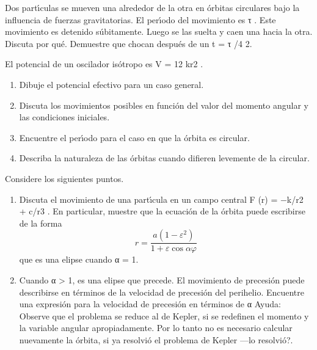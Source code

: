 \documentclass[10pt,oneside]{CBFT_book}
\begin{document}
\begin{ejercicios}

\label{ej1}
\item{ \bf }
Dos partı́culas se mueven una alrededor de la otra en órbitas circulares bajo la influencia
de fuerzas gravitatorias. El perı́odo del movimiento es τ . Este movimiento es detenido
súbitamente. Luego se las suelta y caen una hacia la otra. Discuta por qué. Demuestre
que chocan después de un t = τ /4 2.

\label{ej2}
\item{ \bf }
El potencial de un oscilador isótropo es V = 12 kr2 .
\begin{enumerate}[label=(\alph*)]
\item Dibuje el potencial efectivo para un caso general.
\item Discuta los movimientos posibles en función del valor del momento angular y las
condiciones iniciales.
\item Encuentre el perı́odo para el caso en que la órbita es circular.
\item Describa la naturaleza de las órbitas cuando difieren levemente de la circular.
\end{enumerate}

\label{ej3}
\item{ \bf }
Considere los siguientes puntos.
\begin{enumerate}[label=(\alph*)]
\item Discuta el movimiento de una partı́cula en un campo central F (r) = −k/r2 +
c/r3 . En particular, muestre que la ecuación de la órbita puede escribirse de la
forma
\[
	r = \frac{ a (1 - \varepsilon^2)}{1 + \varepsilon \cos \alpha\varphi }
\]
que es una elipse cuando α = 1.
\item Cuando α > 1, es una elipse que precede. El movimiento de precesión puede
describirse en términos de la velocidad de precesión del perihelio. Encuentre una
expresión para la velocidad de precesión en términos de α
Ayuda: Observe que el problema se reduce al de Kepler, si se redefinen el momento y
la variable angular apropiadamente. Por lo tanto no es necesario calcular nuevamente
la órbita, si ya resolvió el problema de Kepler —lo resolvió?.
\end{enumerate}


\end{ejercicios}
\end{document}
